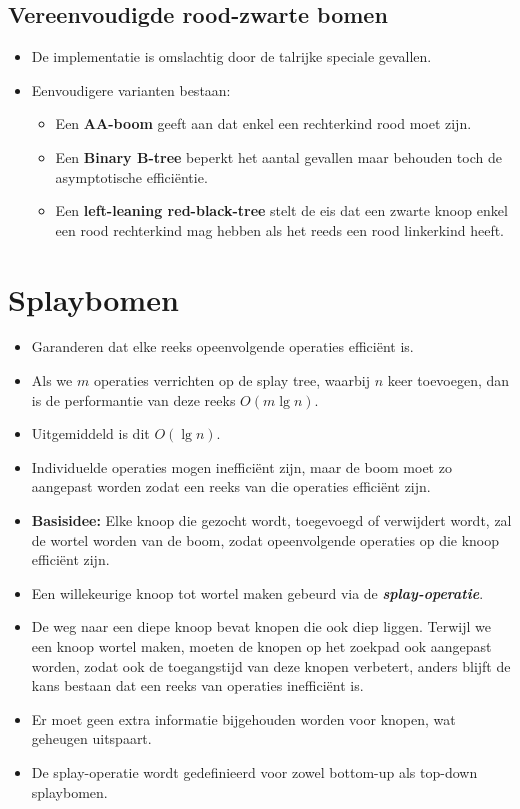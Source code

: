 \subsection{Vereenvoudigde rood-zwarte bomen}
\begin{itemize}
    \item De implementatie is omslachtig door de talrijke speciale gevallen.
    \item Eenvoudigere varianten bestaan:
    \begin{itemize}
        \item Een \textbf{AA-boom} geeft aan dat enkel een rechterkind rood moet zijn.
        \item Een \textbf{Binary B-tree} beperkt het aantal gevallen maar behouden toch de asymptotische efficiëntie.
        \item Een \textbf{left-leaning red-black-tree} stelt de eis dat een zwarte knoop enkel een rood rechterkind mag hebben als het reeds een rood linkerkind heeft.
    \end{itemize}
\end{itemize}
\section{Splaybomen}
\label{sec:splaybomen}
\begin{itemize}
    \item Garanderen dat elke reeks opeenvolgende operaties efficiënt is.
    \item Als we $m$ operaties verrichten op de splay tree, waarbij $n$ keer toevoegen, dan is de performantie van deze reeks $O(m \lg n)$. 
    \item Uitgemiddeld is dit $O(\lg n)$.
    \item Individuelde operaties mogen inefficiënt zijn, maar de boom moet zo aangepast worden zodat een reeks van die operaties efficiënt zijn.
    \item \textbf{Basisidee:} Elke knoop die gezocht wordt, toegevoegd of verwijdert wordt, zal de wortel worden van de boom, zodat opeenvolgende operaties op die knoop efficiënt zijn.
    \item Een willekeurige knoop tot wortel maken gebeurd via de \textbf{\textit{splay-operatie}}.
    \item De weg naar een diepe knoop bevat knopen die ook diep liggen. Terwijl we een knoop wortel maken, moeten de knopen op het zoekpad ook aangepast worden, zodat ook de toegangstijd van deze knopen verbetert, anders blijft de kans bestaan dat een reeks van operaties inefficiënt is.
    \item Er moet geen extra informatie bijgehouden worden voor knopen, wat geheugen uitspaart. 
    \item De splay-operatie wordt gedefinieerd voor zowel bottom-up als top-down splaybomen.
\end{itemize}

